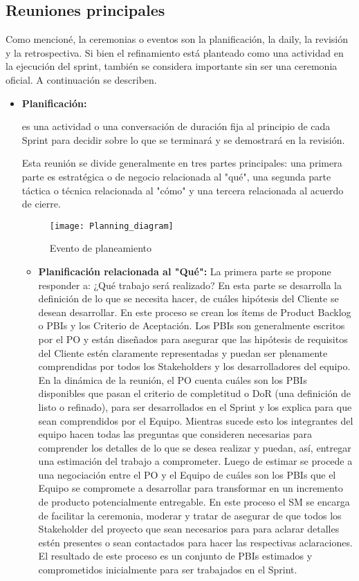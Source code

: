 \subsection{Reuniones principales}

Como mencioné, la ceremonias o eventos son la planificación, la daily, la revisión y la retrospectiva. Si bien el refinamiento está planteado como una actividad en la ejecución del sprint, también se considera importante sin ser una ceremonia oficial. A continuación se describen.

\begin{itemize}

\item \textbf{Planificación:} {es una actividad o una conversación de duración fija al principio de cada Sprint para decidir sobre lo que se terminará y se demostrará en la revisión.

Esta reunión se divide generalmente en tres partes principales: una primera parte es estratégica o de negocio relacionada al "qué", una segunda parte táctica o técnica relacionada al "cómo" y una tercera relacionada al acuerdo de cierre. 

\begin{figure}[h]
  \centering
  \texttt{[image: Planning\_diagram]}
  \caption{Evento de planeamiento}
  \centering
  \label{fig:Planning_diagram} %
\end{figure}
\FloatBarrier
}

\begin{itemize}

\item \textbf{Planificación relacionada al "Qué":} La primera parte se propone responder a: ¿Qué trabajo será realizado? En esta parte se desarrolla la definición de lo que se necesita hacer, de cuáles hipótesis del Cliente se desean desarrollar. En este proceso se crean los ítems de Product Backlog o PBIs y los Criterio de Aceptación. Los PBIs son generalmente escritos por el PO y están diseñados para asegurar que las hipótesis de requisitos del Cliente estén claramente representadas y puedan ser plenamente comprendidas por todos los Stakeholders y los desarrolladores del equipo.
En la dinámica de la reunión, el PO cuenta cuáles son los PBIs disponibles que pasan el criterio de completitud o DoR (una definición de listo o refinado), para ser desarrollados en el Sprint y los explica para que sean comprendidos por el Equipo. Mientras sucede esto los integrantes del equipo hacen todas las preguntas que consideren necesarias para comprender los detalles de lo que se desea realizar y puedan, así, entregar una estimación del trabajo a comprometer. Luego de estimar se procede a una negociación entre el PO y el Equipo de cuáles son los PBIs que el Equipo se compromete a desarrollar para transformar en un incremento de producto potencialmente entregable. En este proceso el SM se encarga de facilitar la ceremonia, moderar y tratar de asegurar de que todos los Stakeholder del proyecto que sean necesarios para para aclarar detalles estén presentes o sean contactados para hacer las respectivas aclaraciones.
El resultado de este proceso es un conjunto de PBIs estimados y comprometidos inicialmente para ser trabajados en el Sprint.


\end{itemize}
\end{itemize}
